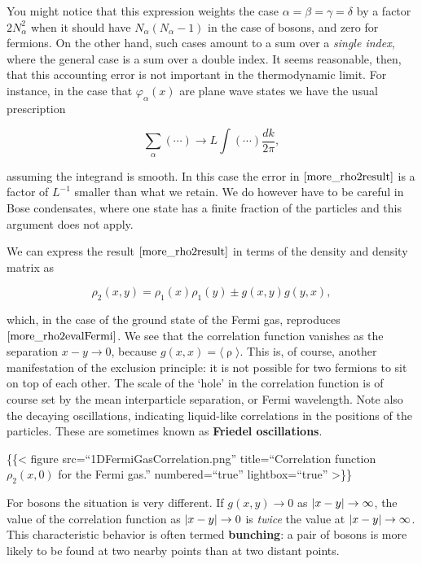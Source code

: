 You might notice that this expression weights the case
\(\alpha=\beta=\gamma=\delta\) by a factor \(2N_\alpha^2\) when it
should have \(N_\alpha(N_\alpha-1)\) in the case of bosons, and zero for
fermions. On the other hand, such cases amount to a sum over a
\emph{single index}, where the general case is a sum over a double
index. It seems reasonable, then, that this accounting error is not
important in the thermodynamic limit. For instance, in the case that
\(\varphi_\alpha(x)\) are plane wave states we have the usual
prescription

\[
\sum_\alpha(\cdots) \longrightarrow L\int (\cdots)\frac{dk}{2\pi},
\]

assuming the integrand is smooth. In this case the error in
\(\eqref{more_rho2result}\) is a factor of \(L^{-1}\) smaller than what
we retain. We do however have to be careful in Bose condensates, where
one state has a finite fraction of the particles and this argument does
not apply.

We can express the result \(\eqref{more_rho2result}\) in terms of the
density and density matrix as

\[
\rho_2(x,y) = \rho_1(x)\rho_1(y) \pm g(x,y)g(y,x),
\label{more_rho2compact}
\]

which, in the case of the ground state of the Fermi gas, reproduces
\(\eqref{more_rho2evalFermi}\). We see that the correlation function
vanishes as the separation \(x-y\to 0\), because
\(g(x,x)=\langle\mathop{\rho(y)}\rangle\). This is, of course, another
manifestation of the exclusion principle: it is not possible for two
fermions to sit on top of each other. The scale of the `hole' in the
correlation function is of course set by the mean interparticle
separation, or Fermi wavelength. Note also the decaying oscillations,
indicating liquid-like correlations in the positions of the particles.
These are sometimes known as \textbf{Friedel oscillations}.

\{\{\textless{} figure src=``1DFermiGasCorrelation.png''
title=``Correlation function \(\rho_2(x,0)\) for the Fermi gas.''
numbered=``true'' lightbox=``true'' \textgreater\}\}

For bosons the situation is very different. If \(g(x,y)\to 0\) as
\(\lvert{x-y}\rvert\to\infty\), the value of the correlation function as
\(\lvert{x-y}\rvert\to 0\) is \emph{twice} the value at \(\lvert{x-y}\rvert\to\infty\).
This characteristic behavior is often termed \textbf{bunching}: a pair
of bosons is more likely to be found at two nearby points than at two
distant points.

